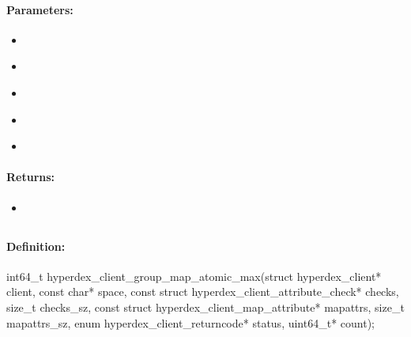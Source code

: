 \paragraph{Parameters:}
\begin{itemize}[noitemsep]
\item {}\\

\item {}\\

\item {}\\

\item {}\\

\item {}\\

\end{itemize}

\paragraph{Returns:}
\begin{itemize}[noitemsep]
\item {}\\

\end{itemize}

\pagebreak
\subsection{}
\label{api:c:group_map_atomic_max}


\paragraph{Definition:}
\begin{ccode}
int64_t hyperdex_client_group_map_atomic_max(struct hyperdex_client* client,
        const char* space,
        const struct hyperdex_client_attribute_check* checks, size_t checks_sz,
        const struct hyperdex_client_map_attribute* mapattrs, size_t mapattrs_sz,
        enum hyperdex_client_returncode* status,
        uint64_t* count);
\end{ccode}

